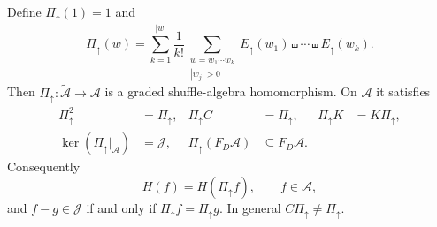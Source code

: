 \begin{theorem}\label{depthcay:thm:projector}
Define $\Pi_{\uparrow}(1)=1$ and
\begin{equation}\label{depthcay:eq:projector}
 \boxed{\displaystyle
 \Pi_{\uparrow}(w)=\sum_{k=1}^{|w|}\frac1{k!}
 \sum_{\substack{w=w_1\cdots w_k\\|w_j|>0}}
 E_{\uparrow}(w_1)\shuffle\cdots\shuffle E_{\uparrow}(w_k).}
\end{equation}
Then $\Pi_{\uparrow}:\widetilde{\mathcal A}\to\mathcal A$ is a graded
shuffle-algebra homomorphism. On $\mathcal A$ it satisfies
\begin{align}
 \Pi_{\uparrow}^2&=\Pi_{\uparrow},&
 \Pi_{\uparrow}C&=\Pi_{\uparrow},&
 \Pi_{\uparrow}K&=K\Pi_{\uparrow},\label{depthcay:eq:properties}\\
 \ker(\Pi_{\uparrow}|_{\mathcal A})&=\mathcal J,&
 \Pi_{\uparrow}(F_D\mathcal A)&\subseteq F_D\mathcal A.
 \label{depthcay:eq:kernel-depth}
\end{align}
Consequently
\begin{equation}\label{depthcay:eq:period-normalform}
 H(f)=H(\Pi_{\uparrow}f),\qquad f\in\mathcal A,
\end{equation}
and $f-g\in\mathcal J$ if and only if
$\Pi_{\uparrow}f=\Pi_{\uparrow}g$.
In general $C\Pi_{\uparrow}\ne\Pi_{\uparrow}$.
\end{theorem}

